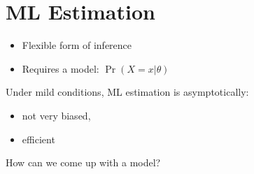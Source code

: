\documentclass[landscape]{foils}
\begin{document}
\myNewSlide
\section*{ML Estimation}
\large
\begin{itemize}
	\item Flexible form of inference
	\item Requires a model: $\Pr(X=x|\theta)$
\end{itemize}
Under mild conditions, ML estimation is asymptotically:
\begin{itemize}
	\item not very biased,
	\item efficient
\end{itemize}
How can we come up with a model?
\end{document}
